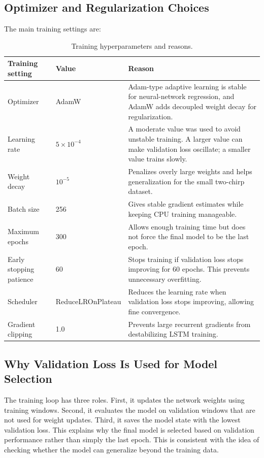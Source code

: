 \documentclass[11pt]{article}
\begin{document}
\subsection{Optimizer and Regularization Choices}
The main training settings are:
\begin{table}[H]
\centering
\small
\begin{tabular}{llp{8cm}}
\toprule
Training setting & Value & Reason \\
\midrule
Optimizer & AdamW & Adam-type adaptive learning is stable for neural-network regression, and AdamW adds decoupled weight decay for regularization. \\
Learning rate & $5\times10^{-4}$ & A moderate value was used to avoid unstable training. A larger value can make validation loss oscillate; a smaller value trains slowly. \\
Weight decay & $10^{-5}$ & Penalizes overly large weights and helps generalization for the small two-chirp dataset. \\
Batch size & 256 & Gives stable gradient estimates while keeping CPU training manageable. \\
Maximum epochs & 300 & Allows enough training time but does not force the final model to be the last epoch. \\
Early stopping patience & 60 & Stops training if validation loss stops improving for 60 epochs. This prevents unnecessary overfitting. \\
Scheduler & ReduceLROnPlateau & Reduces the learning rate when validation loss stops improving, allowing fine convergence. \\
Gradient clipping & 1.0 & Prevents large recurrent gradients from destabilizing LSTM training. \\
\bottomrule
\end{tabular}
\caption{Training hyperparameters and reasons.}
\label{tab:training_choices}
\end{table}

\subsection{Why Validation Loss Is Used for Model Selection}
The training loop has three roles. First, it updates the network weights using training windows. Second, it evaluates the model on validation windows that are not used for weight updates. Third, it saves the model state with the lowest validation loss. This explains why the final model is selected based on validation performance rather than simply the last epoch. This is consistent with the idea of checking whether the model can generalize beyond the training data.
\end{document}
